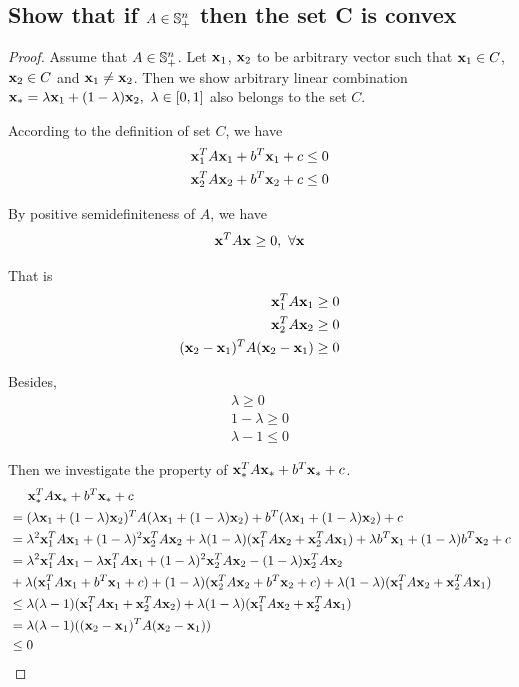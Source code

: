 \documentclass[11pt,a4paper]{article}
\begin{document}
\subsection{Show that if $A \in \mathbb{S}_{+}^{n}$ then the set C is convex}
\begin{proof}
    Assume that $A \in \mathbb{S}_{+}^{n}$.
    Let $\mathbf{x}_{1}$, $\mathbf{x}_{2}$ to be arbitrary vector such that $\mathbf{x}_{1} \in C$, $\mathbf{x}_{2}
    \in C$ and $\mathbf{x}_{1} \not = \mathbf{x}_{2}$.
    Then we show arbitrary linear combination $\mathbf{x}_{*} = \lambda \mathbf{x}_{1} + (1-\lambda) \mathbf{x}_{2},\ \lambda \in
    [0, 1]$ also belongs to the set $C$. 

    According to the definition of set $C$, we have
    \begin{align}
        \mathbf{x}_{1}^{T} A \mathbf{x}_{1} + b^T \mathbf{x}_{1} + c \leq 0 \\
        \mathbf{x}_{2}^{T} A \mathbf{x}_{2} + b^T \mathbf{x}_{2} + c \leq 0
    \end{align}

    By positive semidefiniteness of $A$, we have
    \begin{align}
        \mathbf{x}_{}^{T} A \mathbf{x}_{} \geq 0,\ \forall \mathbf{x}_{}
    \end{align}

    That is 
    \begin{align}
        \mathbf{x}_{1}^{T} A \mathbf{x}_{1} \geq 0 \\ 
        \mathbf{x}_{2}^{T} A \mathbf{x}_{2} \geq 0 \\ 
        (\mathbf{x}_{2} - \mathbf{x}_{1})^{T} A (\mathbf{x}_{2} - \mathbf{x}_{1}) \geq 0 
    \end{align}

    Besides, 
    \begin{align}
        \lambda \geq 0 \\
        1 - \lambda  \geq 0 \\
        \lambda - 1 \leq 0
    \end{align}

    Then we investigate the property of $\mathbf{x}_{*}^{T} A \mathbf{x}_{*} + b^T \mathbf{x}_{*} + c$.
    \begin{align}
        & \hspace{0.5cm} \mathbf{x}_{*}^{T} A \mathbf{x}_{*} + b^T \mathbf{x}_{*} + c  \\
        & = (\lambda \mathbf{x}_{1} + (1-\lambda) \mathbf{x}_{2})^{T} A (\lambda \mathbf{x}_{1} + (1-\lambda) \mathbf{x}_{2}) + b^T (\lambda \mathbf{x}_{1} + (1-\lambda) \mathbf{x}_{2}) + c \\
        & = \lambda^2 \mathbf{x}_{1}^{T} A \mathbf{x}_{1} + (1-\lambda)^2 \mathbf{x}_{2}^{T} A \mathbf{x}_{2} 
        + \lambda(1-\lambda) (\mathbf{x}_{1}^{T} A \mathbf{x}_{2} + \mathbf{x}_{2}^{T} A \mathbf{x}_{1})
        + \lambda b^T \mathbf{x}_{1} + (1-\lambda) b^T \mathbf{x}_{2} + c \\
        & = \lambda^2 \mathbf{x}_{1}^{T} A \mathbf{x}_{1} - \lambda \mathbf{x}_{1}^{T} A \mathbf{x}_{1} 
        + (1-\lambda)^2 \mathbf{x}_{2}^{T} A \mathbf{x}_{2} - (1-\lambda) \mathbf{x}_{2}^{T} A \mathbf{x}_{2}
        \nonumber \\
        & + \lambda(\mathbf{x}_{1}^{T} A \mathbf{x}_{1} + b^T \mathbf{x}_{1} + c) + (1-\lambda)(\mathbf{x}_{2}^{T} A \mathbf{x}_{2} + b^T \mathbf{x}_{2} + c) 
        + \lambda(1-\lambda) (\mathbf{x}_{1}^{T} A \mathbf{x}_{2} + \mathbf{x}_{2}^{T} A \mathbf{x}_{1}) \\
        & \leq \lambda (\lambda - 1) (\mathbf{x}_{1}^{T} A \mathbf{x}_{1} + \mathbf{x}_{2}^{T} A \mathbf{x}_{2}) 
        + \lambda(1-\lambda) (\mathbf{x}_{1}^{T} A \mathbf{x}_{2} + \mathbf{x}_{2}^{T} A \mathbf{x}_{1}) \\
        & = \lambda(\lambda - 1) ((\mathbf{x}_{2} - \mathbf{x}_{1})^{T} A (\mathbf{x}_{2} - \mathbf{x}_{1})) \\
        & \leq 0
    \end{align}


\end{proof}
\end{document}
